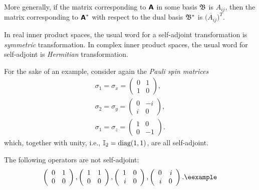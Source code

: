 More generally, if the matrix corresponding to $\textsf{\textbf{A}}$  in some basis ${\frak B}$
is $A_{ij}$,
then the matrix corresponding to $\textsf{\textbf{A}}^*$ with respect to the dual basis
${\frak B}^*$
is
$\overline{(A_{ij}})^T$.

In real inner product spaces,
the usual word for a self-adjoint  transformation
is {\em symmetric} transformation.
In complex inner product spaces,
the usual word for self-adjoint
is {\em Hermitian} transformation.

{\color{blue}
\bexample
For the sake of an example, consider again the
{\em Pauli spin matrices}
\begin{equation}
\begin{array}{l}
\sigma_1=\sigma_x=
\left(
\begin{array}{rrrr}
0&1\\
1&0
\end{array}
\right),   \\
\sigma_2=\sigma_y=
\left(
\begin{array}{rrrrrr}
0&-i\\
i&0
\end{array}
\right),   \\
\sigma_1=\sigma_z=
\left(
\begin{array}{rrrrrrr}
1&0\\
0&-1
\end{array}
\right).
\end{array}
\end{equation}
which, together with unity, i.e., ${\Bbb I}_2=\textrm{diag}(1,1)$,  are all self-adjoint.

The following operators are not self-adjoint:
\begin{equation}
\left(
\begin{array}{rrrrrrrr}
0&1\\
0&0
\end{array}
\right) ,
\left(
\begin{array}{rrrrrrrrrr}
1&1\\
0&0
\end{array}
\right)
,
\left(
\begin{array}{rrrrrrrrrrrr}
1&0\\
i&0
\end{array}
\right),
\left(
\begin{array}{rrrrrrrrrrrrrrrr}
0&i\\
i&0
\end{array}
\right)   .{\textrm{\eexample}}
\end{equation}
%
}

